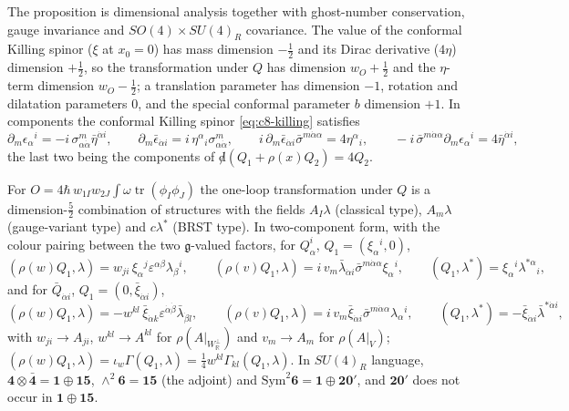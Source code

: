 \begin{remark}
The proposition is dimensional analysis together with ghost-number conservation, gauge invariance and $SO(4)\times SU(4)_R$ covariance. The value of the conformal Killing spinor ($\xi$ at $x_0=0$) has mass dimension $-\tfrac12$ and its Dirac derivative ($4\eta$) dimension $+\tfrac12$, so the transformation under $Q$ has dimension $w_O+\tfrac12$ and the $\eta$-term dimension $w_O-\tfrac12$; a translation parameter has dimension $-1$, rotation and dilatation parameters $0$, and the special conformal parameter $b$ dimension $+1$. In components the conformal Killing spinor \eqref{eq:c8-killing} satisfies
\[
\partial_m\epsilon_\alpha{}^i=-i\,\sigma^m_{\alpha\dot\alpha}\bar\eta^{\dot\alpha i},\qquad \partial_m\bar\epsilon_{\dot\alpha i}=i\,\eta^\alpha{}_i\sigma^m_{\alpha\dot\alpha},\qquad i\,\partial_m\bar\epsilon_{\dot\alpha i}\bar\sigma^{m\dot\alpha\alpha}=4\eta^\alpha{}_i,\qquad -i\,\bar\sigma^{m\dot\alpha\alpha}\partial_m\epsilon_\alpha{}^i=4\bar\eta^{\dot\alpha i},
\]
the last two being the components of ${\not d}(Q_1+\rho(x)Q_2)=4Q_2$.
\end{remark}

\begin{remark}
For $O=4\hbar\,w_{1I}w_{2J}\int\omega\operatorname{tr}(\phi_I\phi_J)$ the one-loop transformation under $Q$ is a dimension-$\tfrac52$ combination of structures with the fields $A_I\lambda$ (classical type), $A_m\lambda$ (gauge-variant type) and $c\lambda^*$ (BRST type). In two-component form, with the colour pairing between the two $\mathfrak g$-valued factors, for $Q^i_\alpha$, $Q_1=(\xi_\alpha{}^i,0)$,
\[
(\rho(w)Q_1,\lambda)=w_{ji}\,\xi_\alpha{}^j\varepsilon^{\alpha\beta}\lambda_\beta{}^i,\qquad (\rho(v)Q_1,\lambda)=i\,v_m\bar\lambda_{\dot\alpha i}\bar\sigma^{m\dot\alpha\alpha}\xi_\alpha{}^i,\qquad (Q_1,\lambda^*)=\xi_\alpha{}^i\lambda^{*\alpha}{}_i,
\]
and for $\bar Q_{\dot\alpha i}$, $Q_1=(0,\bar\xi_{\dot\alpha i})$,
\[
(\rho(w)Q_1,\lambda)=-w^{kl}\,\bar\xi_{\dot\alpha k}\varepsilon^{\dot\alpha\dot\beta}\bar\lambda_{\dot\beta l},\qquad (\rho(v)Q_1,\lambda)=i\,v_m\bar\xi_{\dot\alpha i}\bar\sigma^{m\dot\alpha\alpha}\lambda_\alpha{}^i,\qquad (Q_1,\lambda^*)=-\bar\xi_{\dot\alpha i}\bar\lambda^{*\dot\alpha i},
\]
with $w_{ji}\to A_{ji}$, $w^{kl}\to A^{kl}$ for $\rho(A|_{W_{\mathbb R}^\perp})$ and $v_m\to A_m$ for $\rho(A|_V)$; $(\rho(w)Q_1,\lambda)=\iota_w\Gamma(Q_1,\lambda)=\tfrac14w^{kl}\Gamma_{kl}(Q_1,\lambda)$. In $SU(4)_R$ language, $\mathbf4\otimes\bar{\mathbf4}=\mathbf1\oplus\mathbf{15}$, $\wedge^2\mathbf6=\mathbf{15}$ (the adjoint) and $\mathrm{Sym}^2\mathbf6=\mathbf1\oplus\mathbf{20'}$, and $\mathbf{20'}$ does not occur in $\mathbf1\oplus\mathbf{15}$.
\end{remark}


